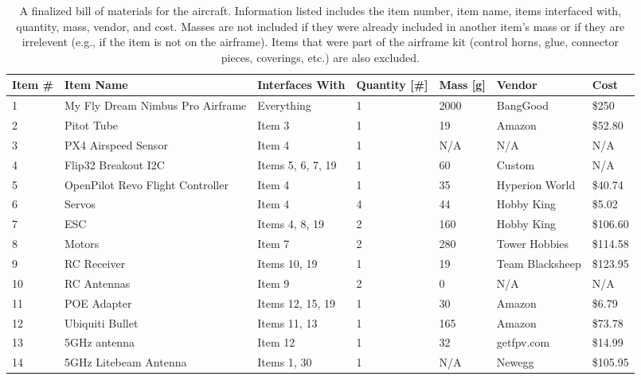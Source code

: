 \documentclass[]{auvsi_doc}
\begin{document}
	\begin{table}[h!]
		\begin{center}
			\caption{A finalized bill of materials for the aircraft. Information listed includes the item number, item name, items interfaced with, quantity, mass, vendor, and cost. Masses are not included if they were already included in another item's mass or if they are irrelevent (e.g., if the item is not on the airframe). Items that were part of the airframe kit (control horns, glue, connector pieces, coverings, etc.) are also excluded.}
			\label{table:BOM}
			\begin{tabular}{p{1cm}p{4cm}p{3cm}p{1.5cm}p{1cm}p{2.5cm}p{1cm}}
				\toprule
				Item \# & Item Name & Interfaces With & Quantity [\#] & Mass [g] & Vendor & Cost \\
				\midrule
				1 & My Fly Dream Nimbus Pro Airframe & Everything & 1 & 2000 & BangGood & \$250  \\
				2 & Pitot Tube & Item 3 & 1 & 19 & Amazon & \$52.80\\
				3 & PX4 Airspeed Sensor & Item 4 & 1 & N/A & N/A & N/A \\
				4 & Flip32 Breakout I2C & Items 5, 6, 7, 19 & 1 & 60 & Custom & N/A \\
				5 & OpenPilot Revo \newline Flight Controller & Item 4 & 1 & 35 & Hyperion \newline World & \$40.74  \\
				6 & Servos & Item 4 & 4 & 44 & Hobby King & \$5.02 \\
				7 & ESC & Items 4, 8, 19 & 2 & 160 & Hobby King & \$106.60 \\
				8 & Motors & Item 7 & 2 & 280 & Tower \newline Hobbies & \$114.58 \\
				9 & RC Receiver & Items 10, 19 & 1 & 19 & Team \newline Blacksheep & \$123.95 \\
				10 & RC Antennas & Item 9 & 2 & 0 & N/A & N/A \\
				11 & POE Adapter & Items 12, 15, 19 & 1 & 30 & Amazon & \$6.79 \\
				12 & Ubiquiti Bullet & Items 11, 13 & 1 & 165 & Amazon & \$73.78 \\
				13 & 5GHz antenna & Item 12 & 1 & 32 & getfpv.com & \$14.99 \\
				14 & 5GHz Litebeam \newline Antenna & Items 1, 30 & 1 & N/A & Newegg & \$105.95 \\

\end{tabular}
\end{center}
\end{table}
\end{document}
